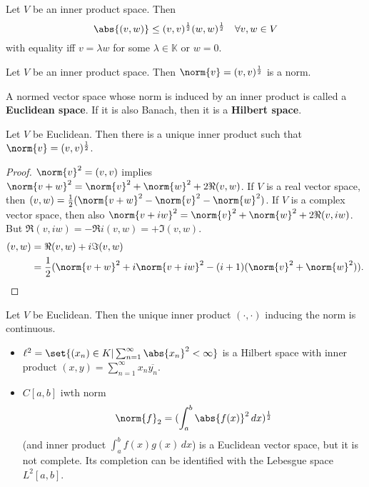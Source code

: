 \documentclass{article}
\newcommand{\K}{\mathbb{K}}
\begin{document}
\begin{prop}
    Let $V$ be an inner product space. Then
    \begin{equation*}
        \abs{(v, w)} \leq (v,v)^\frac{1}{2} (w, w)^\frac{1}{2} \quad \forall v, w \in V
    \end{equation*}
    with equality iff $v = \lambda w$ for some $\lambda \in \K$ or $w = 0$.
\end{prop}

\begin{cor}
    Let $V$ be an inner product space. Then $\norm{v} = (v,v)^\frac{1}{2}$ is a norm.
\end{cor}

\begin{defi}
    A normed vector space whose norm is induced by an inner product is called a \textbf{Euclidean space}.
    If it is also Banach, then it is a \textbf{Hilbert space}.
\end{defi}

\begin{fact}
    Let $V$ be Euclidean. Then there is a unique inner product such that $\norm{v} = (v,v)^\frac{1}{2}$.
\end{fact}

\begin{proof}
    $\norm{v}^2 = (v,v)$ implies $\norm{v+w}^2 = \norm{v}^2 + \norm{w}^2 + 2 \Re(v, w)$.
    If $V$ is a real vector space, then $(v, w) = \frac{1}{2}(\norm{v+w}^2 - \norm{v}^2 - \norm{w}^2)$.
    If $V$ is a complex vector space, then also $\norm{v + iw}^2 = \norm{v}^2 + \norm{w}^2 + 2 \Re(v, iw)$. But $\Re(v, iw) = -\Re i (v, w) = + \Im(v, w)$.
    \begin{align*}
        (v, w) &= \Re (v, w) + i \Im (v, w)  \\
               &= \frac{1}{2} (\norm{v+w}^2 + i \norm{v + i w}^2 - (i+1) (\norm{v}^2 + \norm{w}^2)).
    \end{align*}
\end{proof}

\begin{fact}
    Let $V$ be Euclidean. Then the unique inner product $(\cdot, \cdot)$ inducing the norm is continuous.
\end{fact}


\begin{eg}
    \leavevmode
    \begin{itemize}
        \item $\ell^2 = \set{(x_n) \in K | \sum_{n=1}^\infty \abs{x_n}^2 < \infty}$ is a Hilbert space with inner product $(x, y) = \sum_{n=1}^\infty x_n \overline{y_n}$.
        \item $C[a, b]$ iwth norm
            \begin{equation*}
                \norm{f}_2 = (\int_a^b \abs{f(x)}^2\, dx )^\frac{1}{2}
            \end{equation*}
            (and inner product $\int_a^b f(x) g(x) \, dx$) is a Euclidean vector space, but it is not complete.
            Its completion can be identified with the Lebesgue space $L^2[a, b]$.
    \end{itemize}
\end{eg}
\end{document}
